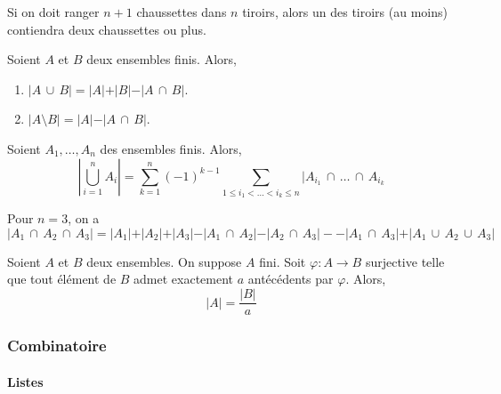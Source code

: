   \begin{remark}[Interprétation]
    Si on doit ranger $n+1$ chaussettes dans $n$ tiroirs, alors un des tiroirs (au moins) contiendra deux chaussettes ou plus.
  \end{remark}

  \begin{proposition}
    Soient $A$ et $B$ deux ensembles finis. Alors,
    \begin{enumerate}[label={\bfseries(\roman*)}]
      \item $\vert A \, \cup \, B \vert = \vert A \vert + \vert B \vert - \vert A \, \cap \, B \vert$.
      \item $\vert A \setminus B \vert = \vert A \vert - \vert A \, \cap \, B \vert$.
    \end{enumerate}
  \end{proposition}

  \begin{proposition}
    Soient $A_1, \dots, A_n$ des ensembles finis. Alors,
    \[ \left\vert \bigcup_{i=1}^n A_i \right\vert = \sum_{k=1}^n (-1)^{k-1} \sum_{1 \leq i_1 < \dots < i_k \leq n} \vert A_{i_1} \, \cap \, \dots \, \cap \, A_{i_k} \]
  \end{proposition}


  \begin{example}
    Pour $n = 3$, on a
    \[ \vert A_1 \, \cap \, A_2 \, \cap \, A_3 \vert = \vert A_1 \vert + \vert A_2 \vert + \vert A_3 \vert - \vert A_1 \, \cap \, A_2 \vert - \vert A_2 \, \cap \, A_3 \vert - - \vert A_1 \, \cap \, A_3 \vert + \vert A_1 \, \cup \, A_2 \, \cup \, A_3 \vert \]
  \end{example}

  \begin{lemma}
    Soient $A$ et $B$ deux ensembles. On suppose $A$ fini. Soit $\varphi : A \rightarrow B$ surjective telle que tout élément de $B$ admet exactement $a$ antécédents par $\varphi$. Alors,
    \[ \vert A \vert = \frac{\vert B \vert}{a} \]
  \end{lemma}

  \subsubsection{Combinatoire}

  \paragraph{Listes}

